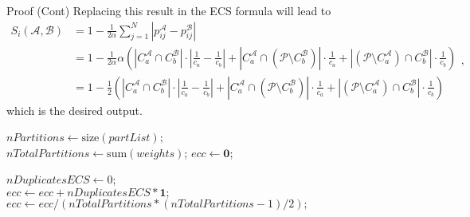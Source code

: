 \begin{frame}
  \begin{block}{Proof (Cont)}
    Replacing this result in the ECS formula will lead to
    \[
    \begin{aligned}
        S_i (\mathcal{A}, \mathcal{B}) &= 1 - \frac{1}{2 \alpha} \sum_{j = 1}^N |p_{ij}^{\mathcal{A}} - p_{ij}^{\mathcal{B}} |  \\
        &= 1 - \frac{1}{2\alpha}\alpha\left( |C_a^\mathcal{A} \cap C_b^\mathcal{B}|\cdot \left|\frac{1}{c_a} - \frac{1}{c_b}\right| + |C_a^\mathcal{A} \cap (\mathcal{P} \setminus C_b^{\mathcal{B}})| \cdot \frac{1}{c_a} + |(\mathcal{P} \setminus C_a^\mathcal{A}) \cap C_b^\mathcal{B}|\cdot \frac{1}{c_b} \right) \\
        &= 1 - \frac{1}{2}\left( |C_a^\mathcal{A} \cap C_b^\mathcal{B}|\cdot \left|\frac{1}{c_a} - \frac{1}{c_b}\right| + |C_a^\mathcal{A} \cap (\mathcal{P} \setminus C_b^{\mathcal{B}})| \cdot \frac{1}{c_a} + |(\mathcal{P} \setminus C_a^\mathcal{A}) \cap C_b^\mathcal{B}|\cdot \frac{1}{c_b} \right)
    \end{aligned} ,
    \]
    which is the desired output.

    \qedsymbol
    \end{block}
    
    \hyperlink{optslide}{}
    \end{frame}


\begin{frame}[label=weight-ecc]{}
    \small
\begin{algorithm}[H]

    $nPartitions \gets \text{size}(partList)$; \\
    $nTotalPartitions \gets \text{sum}(weights)$; 
    $ecc \gets \textbf{0}$; \\
    
    $nDuplicatesECS \gets 0$; \\
    $ecc \gets ecc + nDuplicatesECS * \textbf{1};$ \\
    $ecc \gets ecc / (nTotalPartitions * (nTotalPartitions - 1) / 2);$ \\

\end{algorithm}

\hyperlink{wecc}{}

\end{frame}